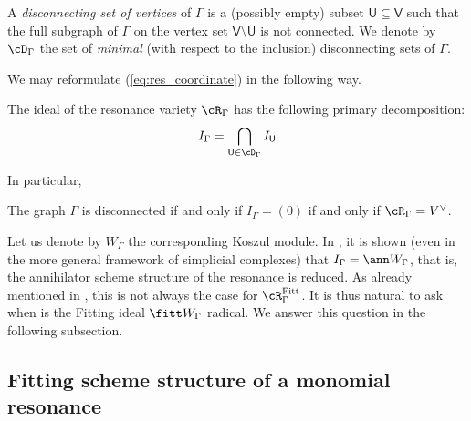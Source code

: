 \documentclass[10pt, leqno]{amsart}
\begin{document}
\begin{defn} \label{defn_disconnecting}
A \emph{disconnecting set of vertices} of $\Gamma$ is a (possibly empty) subset $\mathsf{U} \subseteq \mathsf{V}$ such that the full subgraph of $\Gamma$ on the vertex set $\mathsf{V} \setminus \mathsf{U}$ is not connected. %
We denote by $\cD_\Gamma$ the set of \emph{minimal} (with respect to the inclusion) disconnecting sets of $\Gamma$.
\end{defn}

We may reformulate (\ref{eq:res_coordinate}) in the following way.

\begin{thm} \label{thm_structure_ideal_res}

The ideal of the resonance variety $\cR_\Gamma$ has the following primary decomposition:
\[
I_\Gamma = \bigcap_{\mathsf{U}\in \cD_\Gamma} I_{\mathsf{U}}
\]
\end{thm}

In particular,

\begin{cor} \label{cor_neconex}
The graph $\Gamma$ is disconnected if and only if $I_\Gamma = (0)$ if and only if $\cR_\Gamma = V^\vee$.
\end{cor}

Let us denote by $W_\Gamma$ the corresponding Koszul module. In \cite[Theorem 5.2]{aprodu_higher_2024}, it is shown (even in the more general framework of simplicial complexes) that $I_\Gamma = \ann W_\Gamma$, that is, the annihilator scheme structure of the resonance is reduced. As already mentioned in \cite[Example 5.3]{aprodu_higher_2024}, this is not always the case for $\cR^{\operatorname{Fitt}}_\Gamma$. It is thus natural to ask when is the Fitting ideal $\fitt W_\Gamma$ radical. We answer this question in the following subsection.

\subsection{Fitting scheme structure of a monomial resonance}
\end{document}
